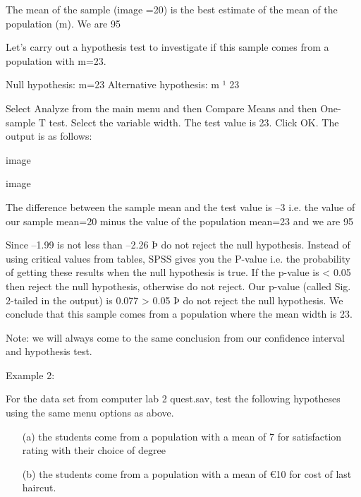The mean of the sample (image =20) is the best estimate of the mean of the population (m). We are 95%
 
Let’s carry out a hypothesis test to investigate if this sample comes from a population with m=23.
 
Null hypothesis: m=23
Alternative hypothesis: m ¹ 23
 
Select Analyze from the main menu and then Compare Means and then One-sample T test. Select the variable width.  The test value is 23. Click OK. The output is as follows:
 
image
 
image
 
The difference between the sample mean and the test value is –3 i.e. the value of our sample mean=20 minus the value of the population mean=23 and we are 95%
 
 
Since –1.99 is not less than –2.26 Þ do not reject the null hypothesis. Instead of using critical values from tables, SPSS gives you the P-value i.e. the probability of getting these results when the null hypothesis is true. If the p-value is < 0.05 then reject the null hypothesis, otherwise do not reject. Our p-value (called Sig. 2-tailed in the output) is 0.077 > 0.05 Þ do not reject the null hypothesis. We conclude that this sample comes from a population where the mean width is 23.
 
Note: we will always come to the same conclusion from our confidence interval and hypothesis test.
 
 
 
Example 2:
 
For the data set from computer lab 2 quest.sav, test the following hypotheses using the same menu options as above.
\begin{itemize} 
\item[(a)]     the students come from a population with a mean of 7 for satisfaction rating with their choice of degree
\item[(b)]     the students come from a population with a mean of €10 for cost of last haircut.
\end{itemize}
 
